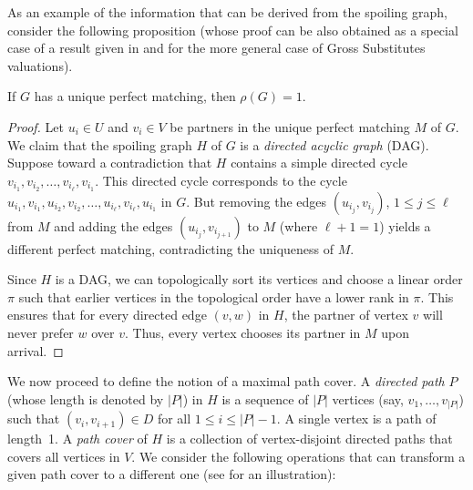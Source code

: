 As an example of the information that can be derived from the spoiling graph, consider the following proposition (whose proof can be also obtained as a special case of a result given in \cite{Cohen-AddadEFF16} and \cite{LemeW17} for the more general case of Gross Substitutes valuations).

\begin{proposition}
	\label{prop:dag}
	If $G$ has a unique perfect matching, then $\rho(G)=1$.
\end{proposition}
\begin{proof}
	Let $u_i\in U$ and $v_i \in V$ be partners in the unique perfect matching $M$ of $G$.
	We claim that the spoiling graph $H$ of $G$ is a \emph{directed acyclic graph} (DAG).
	Suppose toward a %
contradiction that $H$ contains a simple directed cycle $v_{i_1},v_{i_2},\ldots, v_{i_\ell},v_{i_1}$.
	This directed cycle corresponds to the cycle $u_{i_1},v_{i_1},u_{i_2},v_{i_2},\ldots,u_{i_\ell},v_{i_{\ell}},u_{i_1}$ in $G$.
	But removing the edges $(u_{i_j},v_{i_j})$, $1\leq j\leq \ell$ from $M$ and adding the edges $(u_{i_j},v_{i_{j+1}})$ to $M$ (where $\ell+1=1$) yields a different perfect matching, contradicting the uniqueness of $M$.
	
	Since $H$ is a DAG, we can topologically sort its vertices and choose a linear order $\pi$ such that earlier vertices in the topological order have a lower rank in $\pi$. This ensures that for every directed edge $(v,w)$ in $H$,
%
the partner of vertex $v$  %
will never prefer $w$ over $v$. Thus, every vertex chooses its partner in $M$ upon arrival.
\end{proof}

We now proceed to define the notion of a maximal path cover.
A \emph{directed path} $P$ (whose length is denoted by $|P|$) in $H$ is a sequence of $|P|$ vertices (say, $v_1, \ldots, v_{|P|}$) such that $(v_{i}, v_{i+1}) \in D$ for all $1 \le i \le |P|-1$.  
A single vertex is a path of length~1. %
%
%
%
%
%
%
%
A \emph{path cover} of $H$ is a collection of
%
vertex-disjoint   %
directed paths that covers all vertices in $V$. We consider the following operations that can transform a given path cover to a different one (see  for an illustration):

